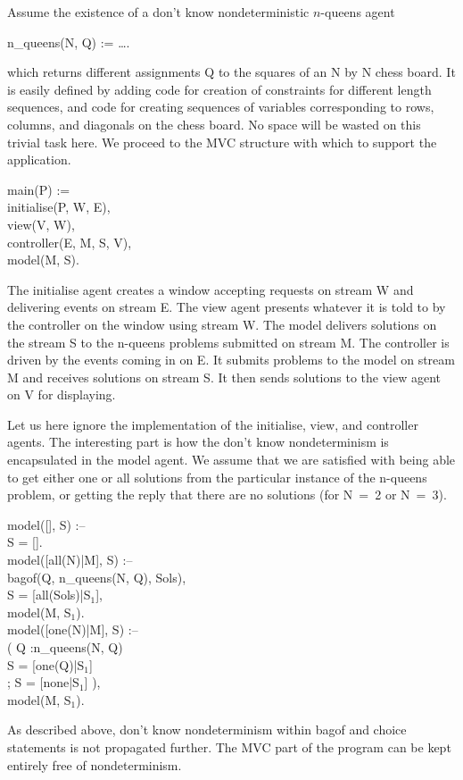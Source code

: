 Assume the existence of a don't know nondeterministic $n$-queens agent
%
\begin{program}
n_queens(N, Q) := \dots.
\end{program}%
%
which returns different assignments {\prog Q} to the squares of an
{\prog N} by {\prog N} chess board.  It is easily defined by adding
code for creation of constraints for different length sequences, and
code for creating sequences of variables corresponding to rows,
columns, and diagonals on the chess board.  No space will be wasted on
this trivial task here.  We proceed to the MVC structure with which to
support the application.
%
\begin{program}
main(P) := \\
\>\>	initialise(P, W, E), \\
\>\>	view(V, W), \\
\>\>	controller(E, M, S, V), \\
\>\>	model(M, S).
\end{program}%
%
The initialise agent creates a window accepting requests on stream
{\prog W} and delivering events on stream {\prog E}.  The view agent
presents whatever it is told to by the controller on the window using
stream {\prog W}.  The model delivers solutions on the stream {\prog
S} to the n-queens problems submitted on stream {\prog M}.  The
controller is driven by the events coming in on {\prog E}.  It submits
problems to the model on stream {\prog M} and receives solutions on
stream {\prog S}.  It then sends solutions to the view agent on {\prog
V} for displaying.

Let us here ignore the implementation of the initialise, view, and
controller agents.  The interesting part is how the don't know
nondeterminism is encapsulated in the model agent.  We assume that we
are satisfied with being able to get either one or all solutions from
the particular instance of the n-queens problem, or getting the reply
that there are no solutions (for {\prog N~=~2} or {\prog N~=~3)}.
%
\begin{program}
model([], S) :-- \\
\>\cond\>	S = [].  \\
model([all(N)|M], S) :-- \\
\>\cond\>	bagof(Q, n_queens(N, Q), Sols), \\
\>\>	S = [all(Sols)|S$_1$], \\
\>\>	model(M, S$_1$).  \\
model([one(N)|M], S) :-- \\
\>\cond\>	( Q :\>\>n_queens(N, Q) \\
\>\>		\>\cond\>S = [one(Q)|S$_1$] \\
\>\>	; 	\>\>S = [none|S$_1$] ), \\
\>\>	model(M, S$_1$).
\end{program}%
%
As described above, don't know nondeterminism within bagof and choice
statements is not propagated further.  The MVC part of the program can
be kept entirely free of nondeterminism.


